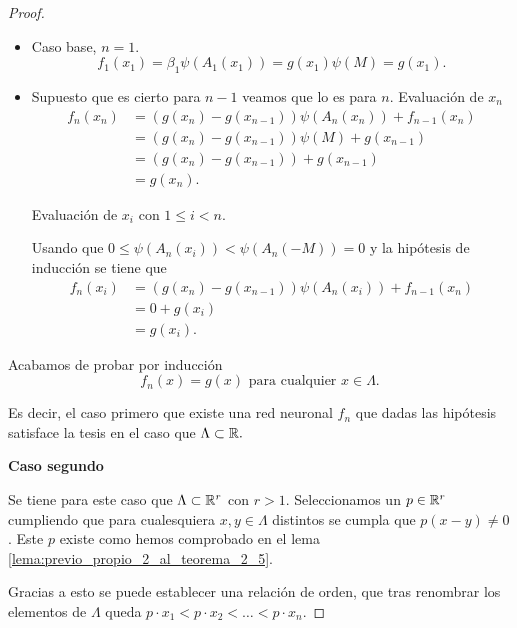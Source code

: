 \begin{proof}
\begin{itemize}
    \item Caso base, $n=1$. 
    \begin{equation}
        f_1(x_1)= \beta_1 \psi(A_1(x_1)) = g(x_1)\psi(M) = g(x_1).
    \end{equation}
    \item Supuesto que es cierto para $n-1$ veamos que lo es para $n$.      
    Evaluación de $x_n$
    \begin{align}
        f_n(x_n) 
        &= 
        (g(x_n) - g(x_{n-1}))\psi(A_n(x_n)) + f_{n-1}(x_n)
        \\
        & = (g(x_n) - g(x_{n-1}))\psi(M) + g(x_{n-1}) 
        \\
        & = (g(x_n) - g(x_{n-1})) + g(x_{n-1}) 
        \\
        & = g(x_n).
    \end{align}

Evaluación de $x_i$ con $1 \leq i < n$. 

Usando que $0 \leq \psi(A_n(x_i)) < \psi(A_n(-M)) = 0$ y la hipótesis de inducción se tiene que 
\begin{align}
    f_n(x_i) 
        &= 
        (g(x_n) - g(x_{n-1}))\psi(A_n(x_i)) + f_{n-1}(x_n)
        \\
        & = 0 + g(x_{i}) 
        \\
        &= g(x_i).
\end{align}
\end{itemize}

Acabamos de probar por inducción 
\begin{equation}
    f_n(x) = g(x) \text{ para cualquier } x \in \Lambda. 
\end{equation}

Es decir, el caso primero que existe una red neuronal $f_n$ que dadas las hipótesis satisface la tesis en el caso que $\Lambda \subset \mathbb{R}.$

\textbf{Caso segundo}  

Se tiene para este caso que $\Lambda \subset \mathbb{R}^r$ con $r >1$. 
Seleccionamos un $p \in \mathbb{R}^r$ cumpliendo que 
para cualesquiera $x,y \in \Lambda$ distintos 
se cumpla que $p(x-y) \neq 0$. Este $p$ existe como hemos comprobado en el lema \ref{lema:previo_propio_2_al_teorema_2_5}.

Gracias a esto se puede establecer una relación de orden, que tras 
renombrar los elementos de $\Lambda$ queda
 $p \cdot x_1 < p \cdot x_2 < \ldots < p \cdot x_n.$


\end{proof}
